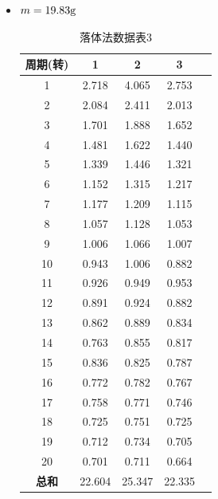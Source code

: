 \documentclass[12pt,hyperref,a4paper,UTF8]{ctexart}
\begin{document}
\begin{itemize}
            \item $m=19.83\text g$
                \begin{table}[H]
                    \centering
                    \begin{tabular}{ccccc}
                    \toprule
                    \textbf{周期(转)} & \textbf{1} & \textbf{2} & \textbf{3} \\
                    \midrule
                    1  & 2.718 & 4.065 & 2.753 \\
                    2  & 2.084 & 2.411 & 2.013 \\
                    3  & 1.701 & 1.888 & 1.652 \\
                    4  & 1.481 & 1.622 & 1.440 \\
                    5  & 1.339 & 1.446 & 1.321 \\
                    6  & 1.152 & 1.315 & 1.217 \\
                    7  & 1.177 & 1.209 & 1.115 \\
                    8  & 1.057 & 1.128 & 1.053 \\
                    9  & 1.006 & 1.066 & 1.007 \\
                    10 & 0.943 & 1.006 & 0.882 \\
                    11 & 0.926 & 0.949 & 0.953 \\
                    12 & 0.891 & 0.924 & 0.882 \\
                    13 & 0.862 & 0.889 & 0.834 \\
                    14 & 0.763 & 0.855 & 0.817 \\
                    15 & 0.836 & 0.825 & 0.787 \\
                    16 & 0.772 & 0.782 & 0.767 \\
                    17 & 0.758 & 0.771 & 0.746 \\
                    18 & 0.725 & 0.751 & 0.725 \\
                    19 & 0.712 & 0.734 & 0.705 \\
                    20 & 0.701 & 0.711 & 0.664 \\
                    \midrule
                    \textbf{总和} & 22.604 & 25.347 & 22.335 \\
                    \bottomrule
                    \end{tabular}
                    \caption{落体法数据表3}
                    \end{table}
                    


\end{itemize}
\end{document}
